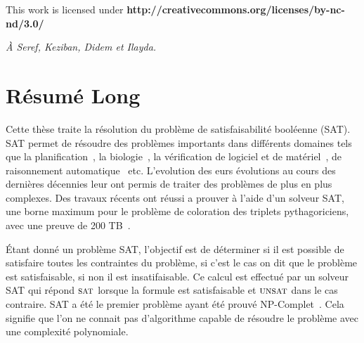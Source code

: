 \clearpage\null\vfill
\thispagestyle{empty}
\begin{minipage}[b]{.9\textwidth}
  \begin{center}
  \setlength{\parskip}{.5\baselineskip}
  {\color{phdcol0}%
   \ccLogo\hspace{.1cm}%
   \ccAttribution\hspace{.1cm}%
   \ccNonCommercial\hspace{.1cm}%
   \ccNoDerivatives}\hspace{.15cm}%
  \footnotesize%
  This work is licensed under {\color{phdcol1}\textbf{http://creativecommons.org/licenses/by-nc-nd/3.0/}}
  \end{center}
\end{minipage}
\vspace*{2\baselineskip}
\clearpage
\thispagestyle{empty}
\begin{flushright}
  \textit{À Seref, Keziban, Didem et Ilayda.}
\end{flushright}
%
%
%
%

\chapter*{Résumé Long}


Cette thèse traite la résolution du problème de satisfaisabilité booléenne (SAT).
SAT permet de résoudre des problèmes importants dans différents domaines tels 
que la planification~\cite{planning_92}, la biologie~\cite{biology_06}, la vérification de logiciel et de 
matériel~\cite{biere1999symbolic}, de raisonnement automatique~\cite{heule2016solving} etc.
L'evolution des eurs évolutions au cours des dernières décennies leur ont permis de traiter des problèmes de plus en plus complexes.
Des travaux récents ont réussi a prouver à l'aide d'un solveur SAT, une borne maximum
pour le problème de coloration des triplets pythagoriciens, avec une preuve de 200 TB~\cite{heule2016solving}.


Étant donné un problème SAT, l'objectif est de  déterminer si il est possible de satisfaire toutes les contraintes du
problème, si c'est le cas on dit que le problème est satisfaisable, si non il est insatifaisable.
%
Ce calcul est effectué par un solveur SAT qui répond $\textsc{sat}$ lorsque la formule est satisfaisable et $\textsc{unsat}$ dans le cas
contraire. SAT a été le premier problème ayant été prouvé NP-Complet~\cite{cook1971complexity}. Cela signifie que
l'on ne connait pas d'algorithme capable de résoudre le problème avec une complexité polynomiale.


